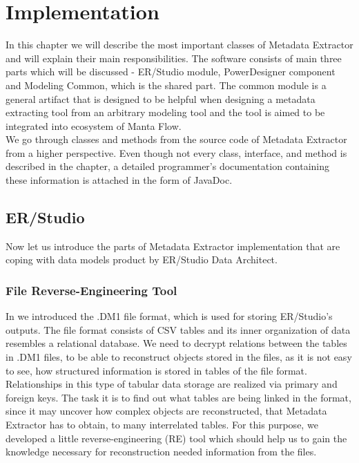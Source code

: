 \chapter{Implementation}
\label{implementation}

In this chapter we will describe the most important classes of Metadata Extractor and will explain their main responsibilities. The software consists of main three parts which will be discussed - ER/Studio module, PowerDesigner component and Modeling Common, which is the shared part. 
The common module is a general artifact that is designed to be helpful when designing a metadata extracting tool from an arbitrary modeling tool and the tool is aimed to be integrated into ecosystem of Manta Flow. \\

We go through classes and methods from the source code of Metadata Extractor from a higher perspective. 
Even though not every class, interface, and method is described in the chapter, a detailed programmer's documentation containing these information is attached in the form of JavaDoc.

\section{ER/Studio}

Now let us introduce the parts of Metadata Extractor implementation that are coping with data models product by ER/Studio Data Architect.

\subsection{File Reverse-Engineering Tool}
\label{subsec:dm1_tool}

In  we introduced the .DM1 file format, which is used for storing ER/Studio's outputs.
The file format consists of CSV tables and its inner organization of data resembles a relational database.
We need to decrypt relations between the tables in .DM1 files, to be able to reconstruct objects stored in the files, as it is not easy to see, how structured information is stored in tables of the file format.
Relationships in this type of tabular data storage are realized via primary and foreign keys.
The task it is to find out what tables are being linked in the format, since it may uncover how complex objects are reconstructed, that Metadata Extractor has to obtain, to many interrelated tables.
For this purpose, we developed a little reverse-engineering (RE) tool which should help us to gain the knowledge necessary for reconstruction needed information from the files. \\

